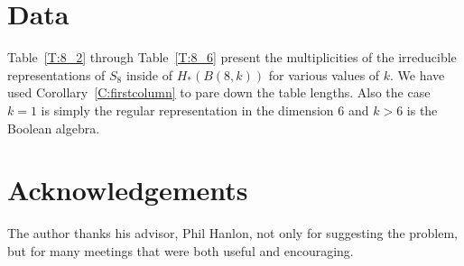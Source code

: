 \documentclass{elsart}
\begin{document}

\section{Data} \label{S:data}
Table~\ref{T:8_2} through Table~\ref{T:8_6} present the multiplicities of the irreducible representations of $S_8$ inside of $H_*(B(8, k))$ for 
various values of $k$. We have used Corollary~\ref{C:firstcolumn} to pare down the table lengths. Also the case $k=1$ is
simply the regular representation in the dimension 6 and $k>6$ is the Boolean algebra.

\section{Acknowledgements}
The author thanks his advisor, Phil Hanlon, not only for suggesting the problem, but for many meetings that were both 
useful and encouraging.

\end{document}
